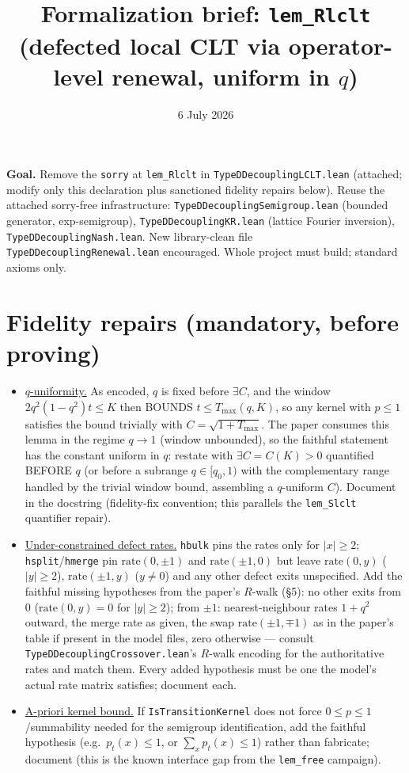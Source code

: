 \documentclass[11pt]{article}
\title{Formalization brief: \texttt{lem\_Rlclt}\\
(defected local CLT via operator-level renewal, uniform in $q$)}
\date{6 July 2026}
\theoremstyle{plain}
\theoremstyle{remark}
\begin{document}
\maketitle

\noindent\textbf{Goal.} Remove the \texttt{sorry} at \texttt{lem\_Rlclt} in
\texttt{TypeDDecouplingLCLT.lean} (attached; modify only this declaration plus
sanctioned fidelity repairs below). Reuse the attached sorry-free
infrastructure: \texttt{TypeDDecouplingSemigroup.lean} (bounded generator,
exp-semigroup), \texttt{TypeDDecouplingKR.lean} (lattice Fourier inversion),
\texttt{TypeDDecouplingNash.lean}. New library-clean file
\texttt{TypeDDecouplingRenewal.lean} encouraged. Whole project must build;
standard axioms only.

\section*{Fidelity repairs (mandatory, before proving)}

\begin{itemize}
\item[(F1)] \underline{$q$-uniformity.} As encoded, $q$ is fixed before
$\exists C$, and the window $2q^2(1-q^2)t\le K$ then BOUNDS $t\le T_{\max}(q,K)$,
so any kernel with $p\le1$ satisfies the bound trivially with
$C=\sqrt{1+T_{\max}}$. The paper consumes this lemma in the regime $q\to1$
(window unbounded), so the faithful statement has the constant uniform in $q$:
restate with $\exists C=C(K)>0$ quantified BEFORE $q$ (or before a subrange
$q\in[q_0,1)$ with the complementary range handled by the trivial window bound,
assembling a $q$-uniform $C$). Document in the docstring (fidelity-fix
convention; this parallels the \texttt{lem\_Slclt} quantifier repair).
\item[(F2)] \underline{Under-constrained defect rates.} \texttt{hbulk} pins the
rates only for $|x|\ge2$; \texttt{hsplit}/\texttt{hmerge} pin
$\mathrm{rate}(0,\pm1)$ and $\mathrm{rate}(\pm1,0)$ but leave
$\mathrm{rate}(0,y)$ ($|y|\ge2$), $\mathrm{rate}(\pm1,y)$ ($y\ne0$) and any
other defect exits unspecified. Add the faithful missing hypotheses from the
paper's $R$-walk (\S5): no other exits from $0$
($\mathrm{rate}(0,y)=0$ for $|y|\ge2$); from $\pm1$: nearest-neighbour rates
$1+q^2$ outward, the merge rate as given, the swap
$\mathrm{rate}(\pm1,\mp1)$ as in the paper's table if present in the model
files, zero otherwise --- consult \texttt{TypeDDecouplingCrossover.lean}'s
$R$-walk encoding for the authoritative rates and match them. Every added
hypothesis must be one the model's actual rate matrix satisfies; document each.
\item[(F3)] \underline{A-priori kernel bound.} If \texttt{IsTransitionKernel}
does not force $0\le p\le1$/summability needed for the semigroup
identification, add the faithful hypothesis (e.g.\ $p_t(x)\le1$, or
$\sum_x p_t(x)\le1$) rather than fabricate; document (this is the known
interface gap from the \texttt{lem\_free} campaign).
\end{itemize}
\end{document}
